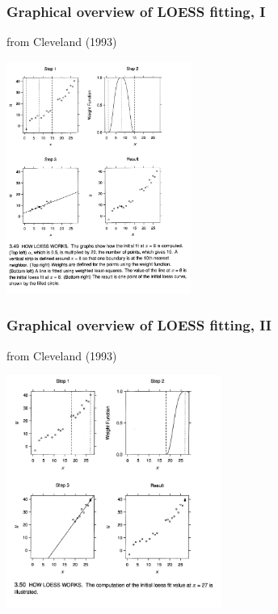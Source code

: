 \documentclass{beamer}
\begin{document}
\begin{frame}
  \frametitle{Graphical overview of LOESS fitting, I}

{\tiny from Cleveland (1993)}
\begin{center}
\includegraphics[height=3in]{loess1.pdf}
\end{center}

\end{frame}

\begin{frame}
  \frametitle{Graphical overview of LOESS fitting, II}

{\tiny from Cleveland (1993)}
\begin{center}
\includegraphics[height=3in]{loess2.pdf}
\end{center}

\end{frame}
\end{document}
